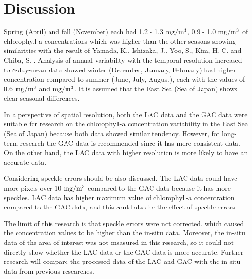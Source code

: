 \section{Discussion}

Spring (April) and fall (November) each had 1.2 - 1.3 $\rm mg/m^3$, 0.9 - 1.0 $\rm mg/m^3$ of chlorophyll-a concentrations which was higher than the other seasons showing similarities with the result of Yamada, K., Ishizaka, J., Yoo, S., Kim, H. C. and Chiba, S. \cite{yamada2004seasonal}. Analysis of annual variability with the temporal resolution increased to 8-day-mean data showed winter (December, January, February) had higher concentration compared to summer (June, July, August), each with the values of 0.6 $\rm mg/m^3$ and $\rm mg/m^3$. It is assumed that the East Sea (Sea of Japan) shows clear seasonal differences.

In a perspective of spatial resolution, both the LAC data and the GAC data were suitable for research on the chlorophyll-a concentration variability in the East Sea (Sea of Japan) because both data showed similar tendency. However, for long-term research the GAC data is recommended since it has more consistent data. On the other hand, the LAC data with higher resolution is more likely to have an accurate data. 

Considering speckle errors should be also discussed. The LAC data could have more pixels over 10 $\rm mg/m^3$ compared to the GAC data because it has more speckles. LAC data has higher maximum value of chlorophyll-a concentration compared to the GAC data, and this could also be the effect of speckle errors. 

The limit of this research is that speckle errors were not corrected, which caused the concentration values to be higher than the in-situ data. Moreover, the in-situ data of the area of interest was not measured in this research, so it could not directly show whether the LAC data or the GAC data is more accurate. Further research will compare the processed data of the LAC and GAC with the in-situ data from previous researches.
